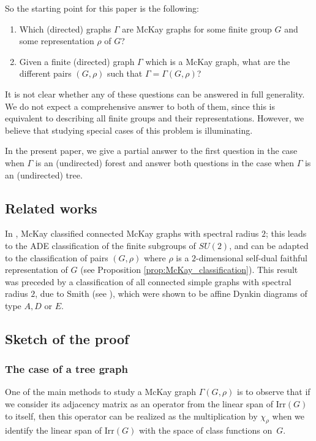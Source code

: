 \documentclass[ALCO]{cedram}
\begin{document}
So the starting point for this paper is the following:

\pagebreak

\begin{problem}
\mbox{}
\begin{enumerate}
    \item Which (directed) graphs $\Gamma$ are McKay graphs for some finite group $G$ and some representation $\rho$ of $G$? 
    \item Given a finite (directed) graph $\Gamma$ which is a McKay graph, what are the different pairs $(G,\rho)$ such that $\Gamma=\Gamma(G,\rho)$?      
\end{enumerate}
\end{problem}
It is not clear whether any of these questions can be answered in full generality. We do not expect a comprehensive answer to both of them, since this is equivalent to describing all finite groups and their representations. However, we believe that studying special cases of this problem is illuminating. 

In the present paper, we {give a partial} answer {to} the first question in the case when $\Gamma$ is an (undirected) forest and {answer both questions} in the case when $\Gamma$ is an (undirected) tree.

\subsection{Related works}\label{ssec:intro_rel_works}
In \cite{McKay}, McKay classified {connected} McKay graphs with spectral radius $2$; this leads to the ADE classification of the finite subgroups of $SU(2)$, and can be adapted to the classification of pairs $(G,\rho)$ where $\rho$ is a $2$-dimensional self-dual faithful representation of $G$ (see Proposition \ref{prop:McKay_classification}). {This result was preceded by a classification of all connected simple graphs with spectral radius $2$, due to Smith (see \cite{Smith}), which were shown to be affine Dynkin diagrams of type $A, D$ or $E$.}

\subsection{Sketch of the proof}

\subsubsection{The case of a tree graph}
One of the main methods to study a McKay graph $\Gamma(G,\rho)$ is to observe that if we consider its adjacency matrix as an operator from the linear span of $\mathrm{Irr}(G)$ to itself, then this operator can be realized as the multiplication by $\chi_\rho$ when we identify the linear span of $\mathrm{Irr}(G)$ with the space of class functions on~$G$.
\end{document}
